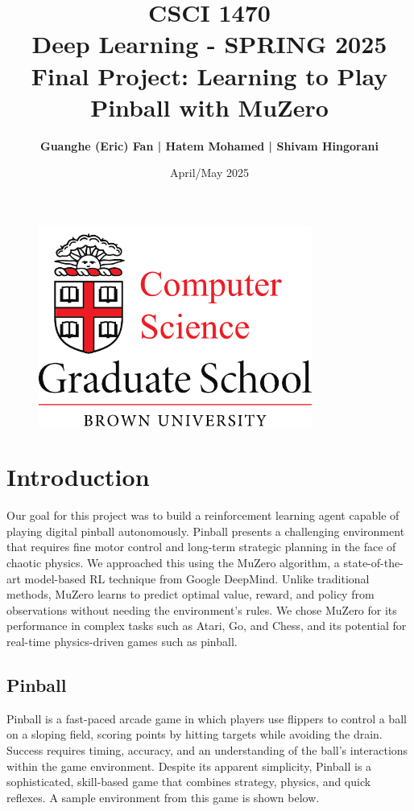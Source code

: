 \documentclass{article}
\begin{document}
\begin{figure}
    \centering
    \includegraphics[width=0.8\textwidth]{brown_graduate_school_logo.pdf}
    \label{fig:brown_graduate_school_logo}
\end{figure}

\title{\huge\bf CSCI 1470 \\ \color{teal} Deep Learning - SPRING 2025\\
\color{red} 
Final Project:
\color{}\normalize Learning to Play Pinball with MuZero\\}
\author{\Large\bf Guanghe (Eric) Fan | Hatem Mohamed | Shivam Hingorani}
\date{April/May 2025}
\maketitle{}
\newpage
\tableofcontents
\newpage
\section{Introduction}
Our goal for this project was to build a reinforcement learning agent capable of playing digital pinball autonomously. Pinball presents a challenging environment that requires fine motor control and long-term strategic planning in the face of chaotic physics. We approached this using the MuZero algorithm, a state-of-the-art model-based RL technique from Google DeepMind. Unlike traditional methods, MuZero learns to predict optimal value, reward, and policy from observations without needing the environment's rules. We chose MuZero for its performance in complex tasks such as Atari, Go, and Chess, and its potential for real-time physics-driven games such as pinball.

\subsection{Pinball}
Pinball is a fast-paced arcade game in which players use flippers to control a ball on a sloping field, scoring points by hitting targets while avoiding the drain. Success requires timing, accuracy, and an understanding of the ball's interactions within the game environment. Despite its apparent simplicity, Pinball is a sophisticated, skill-based game that combines strategy, physics, and quick reflexes. A sample environment from this game is shown below.
\end{document}
